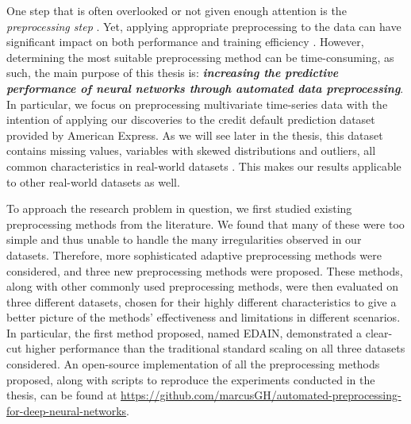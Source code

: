 \documentclass{statsmsc}
\begin{document}
{%
One step that is often overlooked or not given enough attention is the
\textit{preprocessing step} \citep{stanislav}. Yet, applying appropriate
preprocessing to the data can have significant impact on both performance and
training efficiency \citep{preprocess_origin,nawi,singh,dain,bin,mixture_ct}.
However, determining the most suitable preprocessing method can be time-consuming,
as such, the main purpose of this thesis is: \textit{\textbf{increasing the
predictive performance of neural networks through automated data preprocessing}}.  In
particular, we focus on preprocessing multivariate time-series data with the
intention of applying our discoveries to the credit default prediction dataset
provided by American Express. As we will see later in the thesis, this dataset
contains missing values, variables with skewed distributions and outliers, all
common characteristics in real-world datasets \citep{nawi,brits}. This makes our
results applicable to other real-world datasets as well.


To approach the research problem in question, we first studied existing preprocessing methods
from the literature. We found that many of these were too simple and thus unable to handle
the many irregularities observed in our datasets. Therefore, more sophisticated adaptive
preprocessing methods were considered, and three new preprocessing methods were proposed.
These methods, along with other commonly used preprocessing methods,
were then evaluated on three different
datasets, chosen for their highly different characteristics to give a better picture of the
methods' effectiveness and limitations in different scenarios.
In particular, the first method proposed, named \acs{EDAIN}, demonstrated a clear-cut
higher performance than the traditional standard scaling on all three datasets considered.
An open-source implementation of all the preprocessing methods proposed, along with scripts
to reproduce the experiments conducted in the thesis, can be found at
\url{https://github.com/marcusGH/automated-preprocessing-for-deep-neural-networks}.

}
\end{document}

